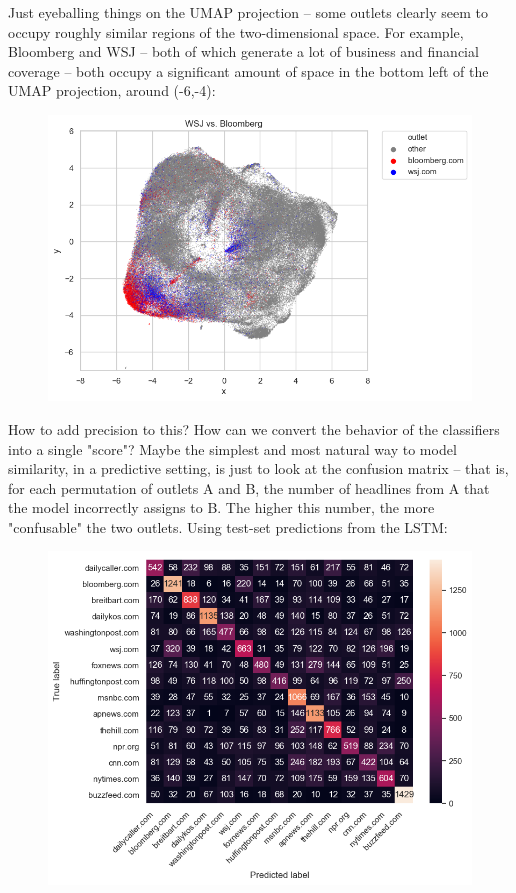 \documentclass{scrartcl}
\begin{document}
Just eyeballing things on the UMAP projection -- some outlets clearly seem to occupy roughly similar regions of the two-dimensional space. For example, Bloomberg and WSJ -- both of which generate a lot of business and financial coverage -- both occupy a significant amount of space in the bottom left of the UMAP projection, around (-6,-4):

\begin{figure}[H]
  \centering
  \includegraphics[height=0.4\textheight]{figures/wsj-bloomberg.png}
\end{figure}

How to add precision to this? How can we convert the behavior of the classifiers into a single "score"? Maybe the simplest and most natural way to model similarity, in a predictive setting, is just to look at the confusion matrix -- that is, for each permutation of outlets A and B, the number of headlines from A that the model incorrectly assigns to B. The higher this number, the more "confusable" the two outlets. Using test-set predictions from the LSTM:

\begin{figure}[H]
  \centering
  \includegraphics[height=0.4\textheight]{figures/lstm-cm.png}
\end{figure}
\end{document}
